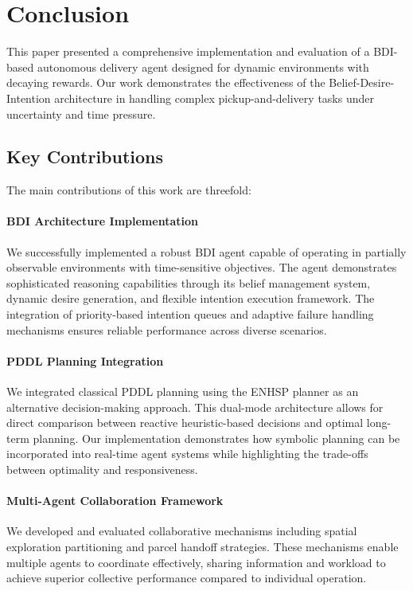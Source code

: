 \section{Conclusion}

This paper presented a comprehensive implementation and evaluation of a BDI-based autonomous delivery agent designed for dynamic environments with decaying rewards. Our work demonstrates the effectiveness of the Belief-Desire-Intention architecture in handling complex pickup-and-delivery tasks under uncertainty and time pressure.

\subsection{Key Contributions}

The main contributions of this work are threefold:

\paragraph{BDI Architecture Implementation}
We successfully implemented a robust BDI agent capable of operating in partially observable environments with time-sensitive objectives. The agent demonstrates sophisticated reasoning capabilities through its belief management system, dynamic desire generation, and flexible intention execution framework. The integration of priority-based intention queues and adaptive failure handling mechanisms ensures reliable performance across diverse scenarios.

\paragraph{PDDL Planning Integration}
We integrated classical PDDL planning using the ENHSP planner as an alternative decision-making approach. This dual-mode architecture allows for direct comparison between reactive heuristic-based decisions and optimal long-term planning. Our implementation demonstrates how symbolic planning can be incorporated into real-time agent systems while highlighting the trade-offs between optimality and responsiveness.

\paragraph{Multi-Agent Collaboration Framework}
We developed and evaluated collaborative mechanisms including spatial exploration partitioning and parcel handoff strategies. These mechanisms enable multiple agents to coordinate effectively, sharing information and workload to achieve superior collective performance compared to individual operation.

